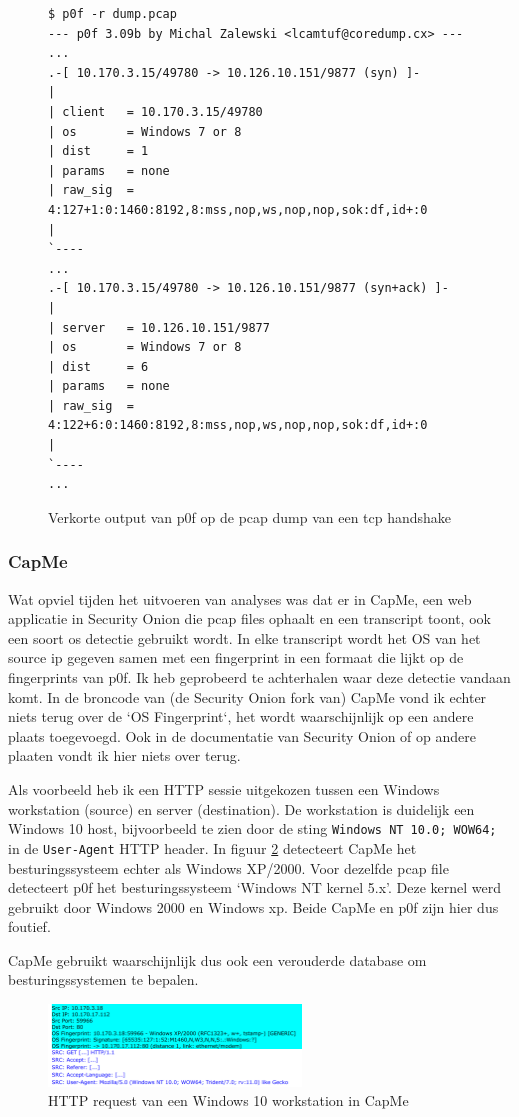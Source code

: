 \documentclass[a4paper, 12pt]{report}
\begin{document}
\begin{figure}[H]
  \begin{lstlisting}
$ p0f -r dump.pcap                                           
--- p0f 3.09b by Michal Zalewski <lcamtuf@coredump.cx> ---
...
.-[ 10.170.3.15/49780 -> 10.126.10.151/9877 (syn) ]-
|
| client   = 10.170.3.15/49780
| os       = Windows 7 or 8
| dist     = 1
| params   = none
| raw_sig  = 4:127+1:0:1460:8192,8:mss,nop,ws,nop,nop,sok:df,id+:0
|
`----
...
.-[ 10.170.3.15/49780 -> 10.126.10.151/9877 (syn+ack) ]-
|
| server   = 10.126.10.151/9877
| os       = Windows 7 or 8
| dist     = 6
| params   = none
| raw_sig  = 4:122+6:0:1460:8192,8:mss,nop,ws,nop,nop,sok:df,id+:0
|
`----
...
  \end{lstlisting}
  \caption{Verkorte output van p0f op de pcap dump van een tcp handshake}
  \label{fig:p0f-so-voorbeeld}
\end{figure}

\subsubsection{CapMe}
Wat opviel tijden het uitvoeren van analyses was dat er in CapMe, een web applicatie in Security Onion die pcap files ophaalt en een transcript toont, ook een soort os detectie gebruikt wordt.
In elke transcript wordt het OS van het source ip gegeven samen met een fingerprint in een formaat die lijkt op de fingerprints van p0f.
Ik heb geprobeerd te achterhalen waar deze detectie vandaan komt.
In de broncode van (de Security Onion fork van) CapMe vond ik echter niets terug over de `OS Fingerprint`, het wordt waarschijnlijk op een andere plaats toegevoegd.
Ook in de documentatie van Security Onion of op andere plaaten vondt ik hier niets over terug.

Als voorbeeld heb ik een HTTP sessie uitgekozen tussen een Windows workstation (source) en server (destination).
De workstation is duidelijk een Windows 10 host, bijvoorbeeld te zien door de sting \lstinline|Windows NT 10.0; WOW64;| in de \lstinline|User-Agent| HTTP header.
In figuur \ref{fig:capme-os-detection} detecteert CapMe het besturingssysteem echter als Windows XP/2000.
Voor dezelfde pcap file detecteert p0f het besturingssysteem `Windows NT kernel 5.x'.
Deze kernel werd gebruikt door Windows 2000 en Windows xp.
Beide CapMe en p0f zijn hier dus foutief.

CapMe gebruikt waarschijnlijk dus ook een verouderde database om besturingssystemen te bepalen.

\begin{figure}[H]
  \centering
  \includegraphics[width=0.6\textwidth]{capme-fingerprint}
  \caption{HTTP request van een Windows 10 workstation in CapMe}
  \label{fig:capme-os-detection}
\end{figure}
\end{document}
